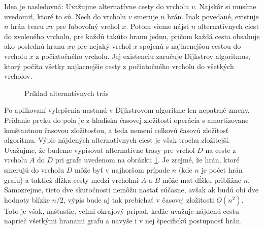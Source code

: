 Idea je nasledovná: Uvažujme alternatívne cesty do vrcholu $v$. Najskôr si musíme uvedomiť, ktoré to sú. Nech do vrcholu $v$ smeruje $n$ hrán. Inak povedané, existuje $n$ hrán tvaru $xv$ pre ľubovoľný vrchol $x$. Potom vieme nájsť $n$ alternatívnych ciest do zvoleného vrcholu, pre každú takúto hranu jednu, pričom každá cesta obsahuje ako poslednú hranu $xv$ pre nejaký vrchol $x$ spojenú s najlacnejšou cestou do vrcholu $x$ z počiatočného vrcholu. Jej existenciu zaručuje Dijkstrov algoritmus, ktorý počíta všetky najlacnejšie cesty z počiatočného vrcholu do všetkých vrcholov.\newline

\begin{figure}[H]
\caption{Príklad alternatívnych trás}
\label{alternativ_priklad2}
\end{figure}

Po aplikovaní vylepšenia nastanú v Dijkstrovom algoritme len nepatrné zmeny. Pridanie prvku do poľa je z hľadiska časovej zložitosti operácia s amortizovane konštantnou časovou zložitosťou, a teda nemení celkovú časovú zložitosť algoritmu. Výpis nájdených alternatívnych ciest je však trochu zložitejší. Uvažujme, že budeme vypisovať alternatívne trasy pre vrchol $D$ na ceste z vrcholu $A$ do $D$ pri grafe uvedenom na obrázku \ref{alternativ_priklad2}. Je zrejmé, že hrán, ktoré smerujú do vrcholu $D$ môže byť v najhoršom prípade $n$ (kde $n$ je počet hrán grafu) a taktiež dĺžka cesty medzi vrcholmi $A$ a $B$ môže mať dĺžku približne $n$. Samozrejme, tieto dve skutočnosti nemôžu nastať súčasne, avšak ak budú obi dve hodnoty blízke $n/2$, výpis bude aj tak prebiehať v časovej zložitosti $O(n^{2})$. Toto je však, našťastie, veľmi okrajový prípad, keďže uvažuje nájdenú cestu naprieč všetkými hranami grafu a navyše i v nej špecifickú postupnosť hrán.\newline


